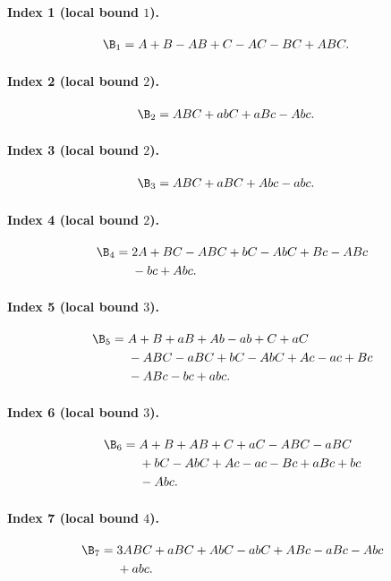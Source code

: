 \paragraph{Index 1 (local bound $1$).}
\begin{align*}
\B_{1}={}&A +B -AB +C -AC -BC +ABC.
\end{align*}
\paragraph{Index 2 (local bound $2$).}
\begin{align*}
\B_{2}={}&ABC +abC +aBc -Abc.
\end{align*}
\paragraph{Index 3 (local bound $2$).}
\begin{align*}
\B_{3}={}&ABC +aBC +Abc -abc.
\end{align*}
\paragraph{Index 4 (local bound $2$).}
\begin{align*}
\B_{4}={}&2A +BC -ABC +bC -AbC +Bc -ABc\\
&{}-bc +Abc.
\end{align*}
\paragraph{Index 5 (local bound $3$).}
\begin{align*}
\B_{5}={}&A +B +aB +Ab -ab +C +aC\\
&{}-ABC -aBC +bC -AbC +Ac -ac +Bc\\
&{}-ABc -bc +abc.
\end{align*}
\paragraph{Index 6 (local bound $3$).}
\begin{align*}
\B_{6}={}&A +B +AB +C +aC -ABC -aBC\\
&{}+bC -AbC +Ac -ac -Bc +aBc +bc\\
&{}-Abc.
\end{align*}
\paragraph{Index 7 (local bound $4$).}
\begin{align*}
\B_{7}={}&3ABC +aBC +AbC -abC +ABc -aBc -Abc\\
&{}+abc.
\end{align*}
